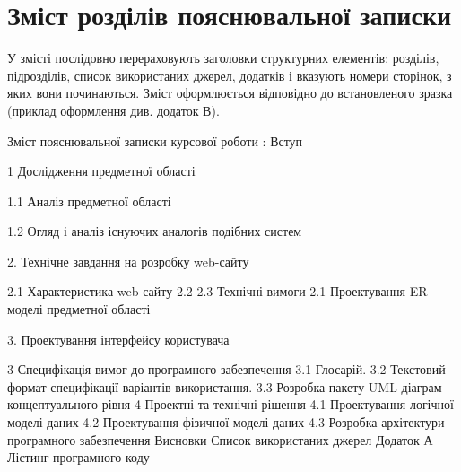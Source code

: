 \chapter{Зміст розділів пояснювальної записки}
У змісті послідовно перераховують заголовки структурних елементів: розділів, підрозділів, список використаних джерел, додатків і вказують номери сторінок, з яких вони починаються. 
Зміст оформлюється відповідно до    встановленого  зразка (приклад оформлення див. додаток В).

Зміст пояснювальної записки курсової роботи :
Вступ 

1  Дослідження предметної області 

1.1 Аналіз предметної області
 
1.2 Огляд і аналіз існуючих аналогів подібних систем 

2. Технічне завдання на розробку web-сайту

2.1 Характеристика web-сайту
2.2 
2.3 Технічні вимоги
2.1  Проектування ER-моделі предметної області 

3. Проектування інтерфейсу користувача






3 Специфікація вимог до програмного забезпечення 
3.1 Глосарій. 
3.2 Текстовий формат специфікації варіантів використання. 
3.3 Розробка пакету UML-діаграм концептуального рівня 
4 Проектні та технічні рішення 
4.1 Проектування логічної моделі даних 
4.2 Проектування фізичної моделі даних 
4.3 Розробка архітектури програмного забезпечення 
Висновки
Список використаних джерел 
Додаток А Лістинг програмного коду  
       
